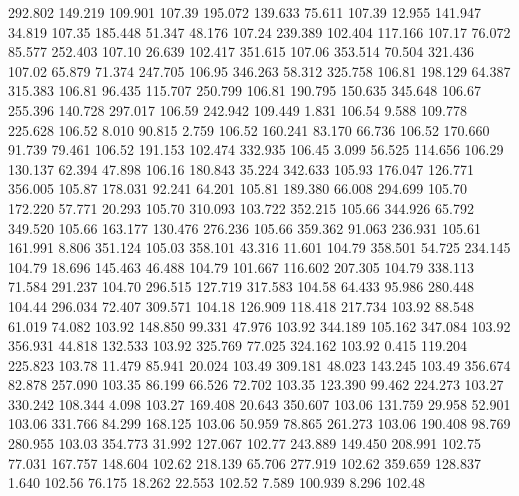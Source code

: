  292.802  149.219  109.901       107.39
 195.072  139.633   75.611       107.39
  12.955  141.947   34.819       107.35
 185.448   51.347   48.176       107.24
 239.389  102.404  117.166       107.17
  76.072   85.577  252.403       107.10
  26.639  102.417  351.615       107.06
 353.514   70.504  321.436       107.02
  65.879   71.374  247.705       106.95
 346.263   58.312  325.758       106.81
 198.129   64.387  315.383       106.81
  96.435  115.707  250.799       106.81
 190.795  150.635  345.648       106.67
 255.396  140.728  297.017       106.59
 242.942  109.449    1.831       106.54
   9.588  109.778  225.628       106.52
   8.010   90.815    2.759       106.52
 160.241   83.170   66.736       106.52
 170.660   91.739   79.461       106.52
 191.153  102.474  332.935       106.45
   3.099   56.525  114.656       106.29
 130.137   62.394   47.898       106.16
 180.843   35.224  342.633       105.93
 176.047  126.771  356.005       105.87
 178.031   92.241   64.201       105.81
 189.380   66.008  294.699       105.70
 172.220   57.771   20.293       105.70
 310.093  103.722  352.215       105.66
 344.926   65.792  349.520       105.66
 163.177  130.476  276.236       105.66
 359.362   91.063  236.931       105.61
 161.991    8.806  351.124       105.03
 358.101   43.316   11.601       104.79
 358.501   54.725  234.145       104.79
  18.696  145.463   46.488       104.79
 101.667  116.602  207.305       104.79
 338.113   71.584  291.237       104.70
 296.515  127.719  317.583       104.58
  64.433   95.986  280.448       104.44
 296.034   72.407  309.571       104.18
 126.909  118.418  217.734       103.92
  88.548   61.019   74.082       103.92
 148.850   99.331   47.976       103.92
 344.189  105.162  347.084       103.92
 356.931   44.818  132.533       103.92
 325.769   77.025  324.162       103.92
   0.415  119.204  225.823       103.78
  11.479   85.941   20.024       103.49
 309.181   48.023  143.245       103.49
 356.674   82.878  257.090       103.35
  86.199   66.526   72.702       103.35
 123.390   99.462  224.273       103.27
 330.242  108.344    4.098       103.27
 169.408   20.643  350.607       103.06
 131.759   29.958   52.901       103.06
 331.766   84.299  168.125       103.06
  50.959   78.865  261.273       103.06
 190.408   98.769  280.955       103.03
 354.773   31.992  127.067       102.77
 243.889  149.450  208.991       102.75
  77.031  167.757  148.604       102.62
 218.139   65.706  277.919       102.62
 359.659  128.837    1.640       102.56
  76.175   18.262   22.553       102.52
   7.589  100.939    8.296       102.48

